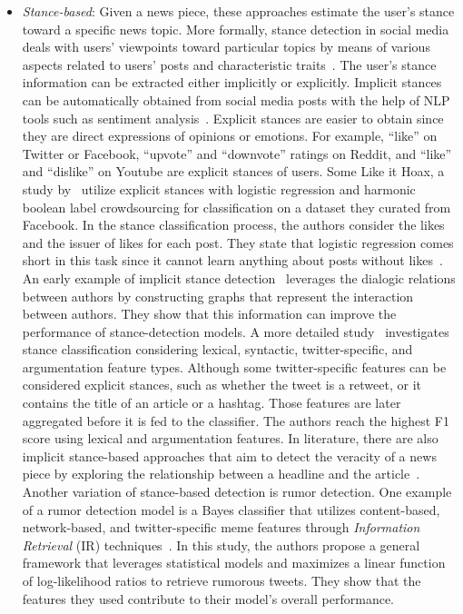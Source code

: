 \begin{itemize}
    \item \emph{Stance-based}: Given a news piece, these approaches estimate the user’s stance toward a specific news topic. More formally, stance detection in social media deals with users’ viewpoints toward particular topics by means of various aspects related to users’ posts and characteristic traits~\parencite{StanceDetectionOnSocialMeda_Abeer}. The user’s stance information can be extracted either implicitly or explicitly. Implicit stances can be automatically obtained from social media posts with the help of NLP tools such as sentiment analysis~\parencite{StanceAndSentimentINTweets_Saif}. Explicit stances are easier to obtain since they are direct expressions of opinions or emotions. For example, “like” on Twitter or Facebook, “upvote” and “downvote” ratings on Reddit, and “like” and “dislike” on Youtube are explicit stances of users. Some Like it Hoax, a study by~\cite{SomeLikeItHoaxDataset_Tacchini} utilize explicit stances with logistic regression and harmonic boolean label crowdsourcing for classification on a dataset they curated from Facebook. In the stance classification process, the authors consider the likes and the issuer of likes for each post. They state that logistic regression comes short in this task since it cannot learn anything about posts without likes~\parencite{SomeLikeItHoaxDataset_Tacchini}. An early example of implicit stance detection~\parencite{StanceClassificationDialogicProps_Walker} leverages the dialogic relations between authors by constructing graphs that represent the interaction between authors. They show that this information can improve the performance of stance-detection models. A more detailed study~\parencite{StanceClassificationOnTwitterDebates_Addawood} investigates stance classification considering lexical, syntactic, twitter-specific, and argumentation feature types. Although some twitter-specific features can be considered explicit stances, such as whether the tweet is a retweet, or it contains the title of an article or a hashtag. Those features are later aggregated before it is fed to the classifier. The authors reach the highest F1 score using lexical and argumentation features. In literature, there are also implicit stance-based approaches that aim to detect the veracity of a news piece by exploring the relationship between a headline and the article~\parencite{ARetrospectiveAnalysisOfFNC_Hanselowski, StanceDetectionInFakeNews_Ghanem}.\\Another variation of stance-based detection is rumor detection. One example of a rumor detection model is a Bayes classifier that utilizes content-based, network-based, and twitter-specific meme features through \emph{Information Retrieval} (IR) techniques~\parencite{RumorHasIt_Qazvinian}.  In this study, the authors propose a general framework that leverages statistical models and maximizes a linear function of log-likelihood ratios to retrieve rumorous tweets. They show that the features they used contribute to their model's overall performance.

\end{itemize}
